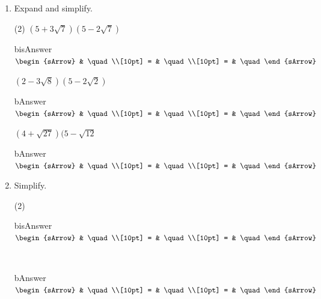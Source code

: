\begin{enumerate}
  \item Expand and simplify.
  \begin{subtask}(2)
    \task[] $ (5+3\sqrt{7})(5-2\sqrt{7}) $
              \begin{envOut}[equal height group=A-Rev-1]{bisAnswer}
			       $\begin{sArrow}
			             & \quad               \\[10pt]
                       = & \quad               \\[10pt]      
					   = & \quad  
	                \end{sArrow}$
              \end{envOut}
    \task[] $ (2-3\sqrt{8})(5-2\sqrt{2}) $
              \begin{envOut}[equal height group=A-Rev-1]{bAnswer}
			       $\begin{sArrow}
			             & \quad                 \\[10pt]
                       = & \quad                 \\[10pt]      
					   = & \quad  
	                \end{sArrow}$
              \end{envOut}
    \task[] $ (4+ \sqrt{27})( 5-\sqrt{12}$
              \begin{envOut}[equal height group=A-Rev-1]{bAnswer}
			       $\begin{sArrow}
			             & \quad                 \\[10pt]
                       = & \quad                 \\[10pt]      
					   = & \quad  
	                \end{sArrow}$
              \end{envOut}
  \end{subtask}

  \item Simplify.
  \begin{subtask}(2)
    \task[] $ \quad $
              \begin{envOut}[equal height group=A-Rev-1]{bisAnswer}
			       $\begin{sArrow}
			             & \quad              \\[10pt]
                       = & \quad               \\[10pt]      
					   = & \quad  
	                \end{sArrow}$
              \end{envOut}
    \task[] $ \quad $
              \begin{envOut}[equal height group=A-Rev-1]{bAnswer}
			       $\begin{sArrow}
			             & \quad                 \\[10pt]
                       = & \quad                 \\[10pt]      
					   = & \quad  
	                \end{sArrow}$
              \end{envOut}
  \end{subtask}
\end{enumerate}


